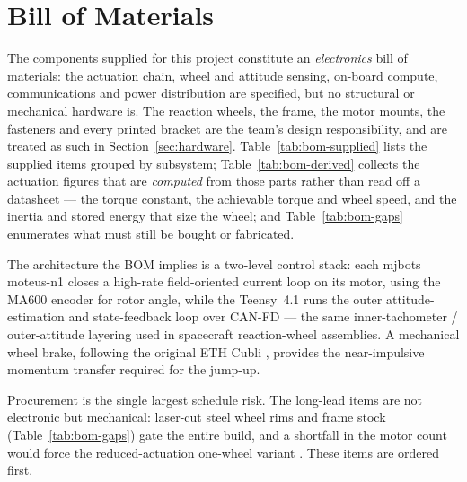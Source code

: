 \appendix
\section{Bill of Materials}
\label{app:bom}

The components supplied for this project constitute an \emph{electronics} bill of
materials: the actuation chain, wheel and attitude sensing, on-board compute,
communications and power distribution are specified, but no structural or
mechanical hardware is. The reaction wheels, the frame, the motor mounts, the
fasteners and every printed bracket are the team's design responsibility, and are
treated as such in Section~\ref{sec:hardware}. Table~\ref{tab:bom-supplied} lists
the supplied items grouped by subsystem; Table~\ref{tab:bom-derived} collects the
actuation figures that are \emph{computed} from those parts rather than read off a
datasheet --- the torque constant, the achievable torque and wheel speed, and the
inertia and stored energy that size the wheel; and Table~\ref{tab:bom-gaps}
enumerates what must still be bought or fabricated.

The architecture the BOM implies is a two-level control stack: each mjbots
moteus-n1 closes a high-rate field-oriented current loop on its motor, using the
MA600 encoder for rotor angle, while the Teensy~4.1 runs the outer
attitude-estimation and state-feedback loop over CAN-FD --- the same
inner-tachometer / outer-attitude layering used in spacecraft reaction-wheel
assemblies. A mechanical wheel brake, following the original ETH Cubli
\cite{gajamohan2013cubli}, provides the near-impulsive momentum transfer required
for the jump-up.

Procurement is the single largest schedule risk. The long-lead items are not
electronic but mechanical: laser-cut steel wheel rims and frame stock
(Table~\ref{tab:bom-gaps}) gate the entire build, and a shortfall in the motor
count would force the reduced-actuation one-wheel variant
\cite{hofer2023onewheelcubli}. These items are ordered first.

